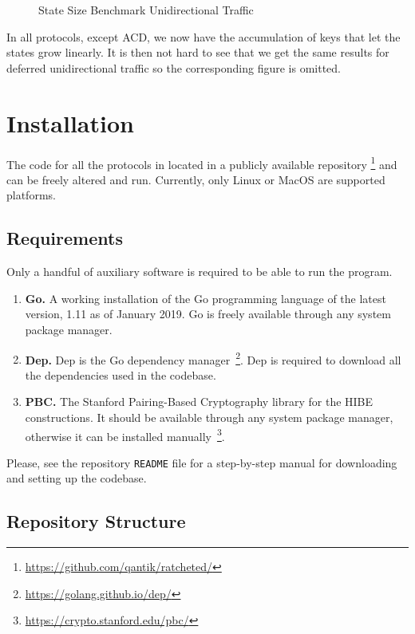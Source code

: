 \documentclass[11pt,a4paper,twoside,openright,bibliography=totoc]{scrbook}
\begin{document}
\begin{figure}[H]
  \centering
   
  \caption{State Size Benchmark Unidirectional Traffic}
  \label{fig:state-size-uni}
\end{figure}

In all protocols, except ACD, we now have the accumulation
of keys that let the states grow linearly. It is then not
hard to see that we get the same results for deferred
unidirectional traffic so the corresponding figure
is omitted.

\section{Installation}
\label{sec:installation}

The code for all the protocols in located in a
publicly available repository
\footnote{\url{https://github.com/qantik/ratcheted/}} and
can be freely altered and run. Currently, only Linux
or MacOS are supported platforms.

\subsection{Requirements}
\label{sec:requirements}

Only a handful of auxiliary software is required to
be able to run the program.
\begin{enumerate}
\item \textbf{Go.} A working installation of the
  Go programming language of the latest version, 1.11 as of
  January 2019. Go is freely available through any
  system package manager.
\item \textbf{Dep.} Dep is the Go dependency
  manager~\footnote{\url{https://golang.github.io/dep/}}. Dep
  is required to download all the dependencies used
  in the codebase.
\item \textbf{PBC.} The Stanford Pairing-Based Cryptography library
  for the HIBE constructions. It should be available through any
  system package manager, otherwise it can be installed
  manually~\footnote{\url{https://crypto.stanford.edu/pbc/}}.
\end{enumerate}
Please, see the repository \texttt{README} file for a
step-by-step manual for downloading and setting
up the codebase.

\subsection{Repository Structure}
\label{sec:repository-structure}
\end{document}
